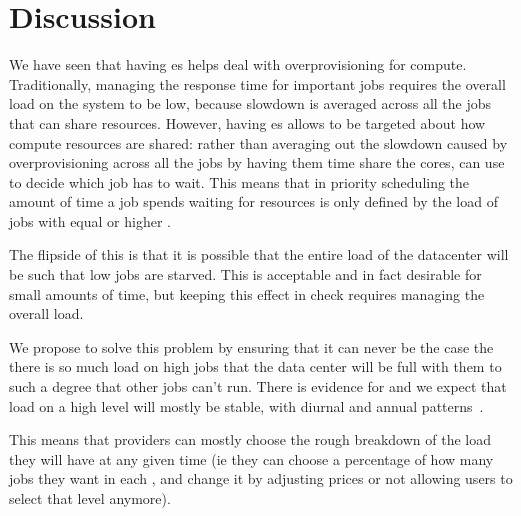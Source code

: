 \section{Discussion}


We have seen that having \priceclass{}es helps \sys{} deal with overprovisioning
for compute. Traditionally, managing the response time for important jobs
requires the overall load on the system to be low, because slowdown is averaged
across all the jobs that can share resources. However, having \class{}es allows
\sys{} to be targeted about how compute resources are shared: rather than
averaging out the slowdown caused by overprovisioning across all the jobs by
having them time share the cores, \sys{} can use \class{} to decide which job
has to wait. This means that in priority scheduling the amount of time a job
spends waiting for resources is only defined by the load of jobs with equal or
higher \class{}.

The flipside of this is that it is possible that the entire load of the
datacenter will be such that low \class{} jobs are starved. This is acceptable
and in fact desirable for small amounts of time, but keeping this effect in
check requires managing the overall load. 

We propose to solve this problem by ensuring that it can never be the case the
there is so much load on high \class{} jobs that the data center will be full
with them to such a degree that other jobs can't run. There is evidence for and
we expect that load on a high level will mostly be stable, with diurnal and
annual patterns~\cite{econ-of-serverless}.

This means that providers can mostly choose the rough breakdown of the load they
will have at any given time (ie they can choose a percentage of how many jobs
they want in each \class{}, and change it by adjusting prices or not allowing
users to select that level anymore). 



% 
